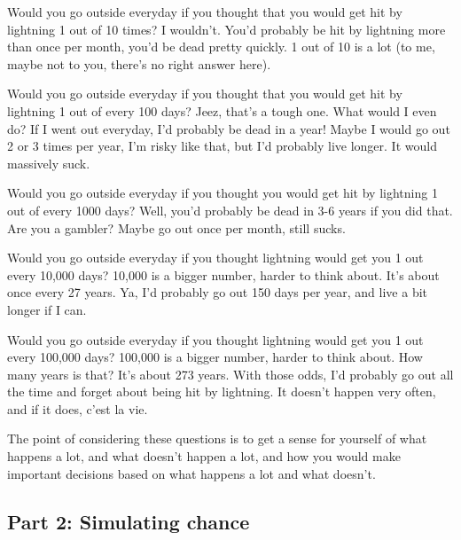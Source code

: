 \documentclass[
]{book}
\begin{document}
Would you go outside everyday if you thought that you would get hit by lightning 1 out of 10 times? I wouldn't. You'd probably be hit by lightning more than once per month, you'd be dead pretty quickly. 1 out of 10 is a lot (to me, maybe not to you, there's no right answer here).

Would you go outside everyday if you thought that you would get hit by lightning 1 out of every 100 days? Jeez, that's a tough one. What would I even do? If I went out everyday, I'd probably be dead in a year! Maybe I would go out 2 or 3 times per year, I'm risky like that, but I'd probably live longer. It would massively suck.

Would you go outside everyday if you thought you would get hit by lightning 1 out of every 1000 days? Well, you'd probably be dead in 3-6 years if you did that. Are you a gambler? Maybe go out once per month, still sucks.

Would you go outside everyday if you thought lightning would get you 1 out every 10,000 days? 10,000 is a bigger number, harder to think about. It's about once every 27 years. Ya, I'd probably go out 150 days per year, and live a bit longer if I can.

Would you go outside everyday if you thought lightning would get you 1 out every 100,000 days? 100,000 is a bigger number, harder to think about. How many years is that? It's about 273 years. With those odds, I'd probably go out all the time and forget about being hit by lightning. It doesn't happen very often, and if it does, c'est la vie.

The point of considering these questions is to get a sense for yourself of what happens a lot, and what doesn't happen a lot, and how you would make important decisions based on what happens a lot and what doesn't.

\hypertarget{part-2-simulating-chance}{%
\subsection{Part 2: Simulating chance}\label{part-2-simulating-chance}}
\end{document}
